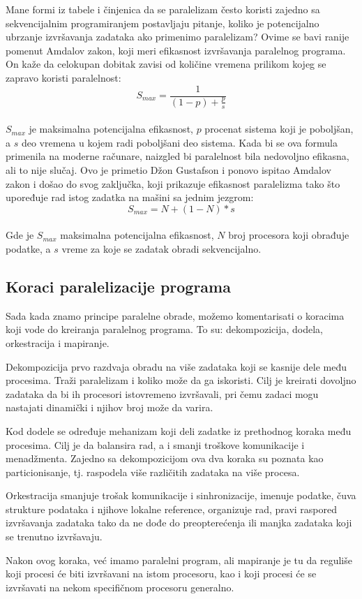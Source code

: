 \documentclass[a4paper]{article}
\begin{document}
Mane formi iz tabele i činjenica da se paralelizam često koristi zajedno sa sekvencijalnim programiranjem postavljaju pitanje, koliko je potencijalno ubrzanje izvršavanja zadataka ako primenimo paralelizam? Ovime se bavi ranije pomenut Amdalov zakon, koji meri efikasnost izvršavanja paralelnog programa. On kaže da celokupan dobitak zavisi od količine vremena prilikom kojeg se zapravo koristi paralelnost: \\
\begin{equation*}
S_{max} = \frac{1}{(1 - p) + \frac{p}{s}}
\end{equation*}\\
$S_{max}$ je maksimalna potencijalna efikasnost, $p$ procenat sistema koji je poboljšan, a $s$ deo vremena u kojem radi poboljšani deo sistema. Kada bi se ova formula primenila na moderne računare, naizgled bi paralelnost bila nedovoljno efikasna, ali to nije slučaj. Ovo je primetio Džon Gustafson i ponovo ispitao Amdalov zakon i došao do svog zaključka, koji prikazuje efikasnost paralelizma tako što upoređuje rad istog zadatka na mašini sa jednim jezgrom:\\
\begin{equation*}
S_{max} = N + (1 - N) * s
\end{equation*}\\
Gde je $S_{max}$ maksimalna potencijalna efikasnost, $N$ broj procesora koji obrađuje podatke, a $s$ vreme za koje se zadatak obradi sekvencijalno.
\subsection{Koraci paralelizacije programa}
Sada kada znamo principe paralelne obrade, možemo komentarisati o koracima koji vode do kreiranja paralelnog programa. To su: dekompozicija, dodela, orkestracija i mapiranje.\par
Dekompozicija prvo razdvaja obradu na više zadataka koji se kasnije dele među procesima. Traži paralelizam i koliko može da ga iskoristi. Cilj je kreirati dovoljno zadataka da bi ih procesori istovremeno izvršavali, pri čemu zadaci mogu nastajati dinamički i njihov broj može da varira.\par 
Kod dodele se određuje mehanizam koji deli zadatke iz prethodnog koraka među procesima. Cilj je da balansira rad, a i smanji troškove komunikacije i menadžmenta. Zajedno sa dekompozicijom ova dva koraka su poznata kao particionisanje, tj. raspodela više različitih zadataka na više procesa. \par 
Orkestracija smanjuje trošak komunikacije i sinhronizacije, imenuje podatke, čuva strukture podataka i njihove lokalne reference, organizuje rad, pravi raspored izvršavanja zadataka tako da ne dođe do preopterećenja ili manjka zadataka koji se trenutno izvršavaju. \par 
Nakon ovog koraka, već imamo paralelni program, ali mapiranje je tu da reguliše koji procesi će biti izvršavani na istom procesoru, kao i koji procesi će se izvršavati na nekom specifičnom procesoru generalno. 
\end{document}
